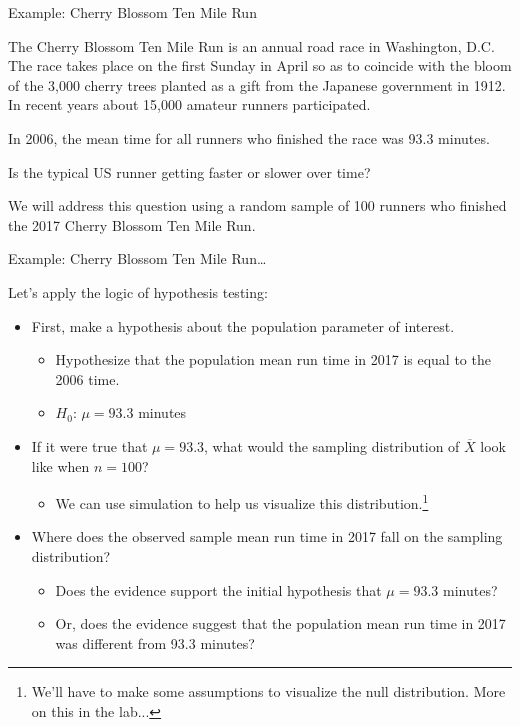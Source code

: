 \documentclass[
  ignorenonframetext,
  aspectratio=169]{beamer}
\providecommand{\tightlist}{%
  \setlength{\itemsep}{0pt}\setlength{\parskip}{0pt}}
\begin{document}
\begin{frame}{Example: Cherry Blossom Ten Mile Run}
\protect\hypertarget{example-cherry-blossom-ten-mile-run}{}
\small

The Cherry Blossom Ten Mile Run is an annual road race in Washington,
D.C. The race takes place on the first Sunday in April so as to coincide
with the bloom of the 3,000 cherry trees planted as a gift from the
Japanese government in 1912. In recent years about 15,000 amateur
runners participated.

In 2006, the mean time for all runners who finished the race was 93.3
minutes.

Is the typical US runner getting faster or slower over time?

We will address this question using a random sample of 100 runners who
finished the 2017 Cherry Blossom Ten Mile Run.
\end{frame}

\begin{frame}{Example: Cherry Blossom Ten Mile Run\ldots{}}
\protect\hypertarget{example-cherry-blossom-ten-mile-run-1}{}
\small

Let's apply the logic of hypothesis testing:

\begin{itemize}
\item
  First, make a hypothesis about the population parameter of interest.

  \begin{itemize}
  \item
    Hypothesize that the population mean run time in 2017 is equal to
    the 2006 time.
  \item
    \(H_0\): \(\mu = 93.3\) minutes
  \end{itemize}
\item
  If it were true that \(\mu = 93.3\), what would the sampling
  distribution of \(\overline{X}\) look like when \(n = 100\)?

  \begin{itemize}
  \tightlist
  \item
    We can use simulation to help us visualize this
    distribution.\footnote{We'll have to make some assumptions to visualize the null distribution. More on this in the lab...}
  \end{itemize}
\item
  Where does the observed sample mean run time in 2017 fall on the
  sampling distribution?

  \begin{itemize}
  \item
    Does the evidence support the initial hypothesis that \(\mu = 93.3\)
    minutes?
  \item
    Or, does the evidence suggest that the population mean run time in
    2017 was different from 93.3 minutes?
  \end{itemize}
\end{itemize}
\end{frame}
\end{document}
